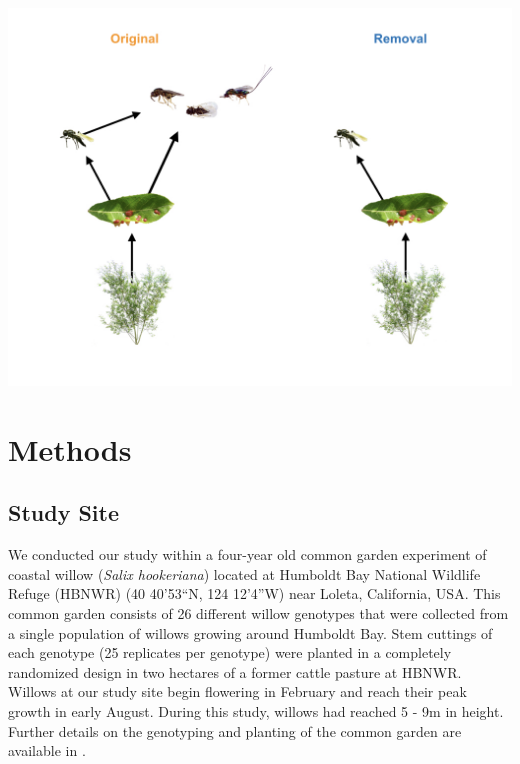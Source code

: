 \documentclass[11pt,]{article}
\let\origfigure\figure
\let\endorigfigure\endfigure
\renewenvironment{figure}[1][2] {
    \expandafter\origfigure\expandafter[H]
} {
    \endorigfigure
}
\begin{document}
\begin{figure}
\centering
\includegraphics{../analyses/complex_simple_foodwebs_v4.jpeg}
\caption{\label{fig:Conceptual}Experimental manipulation of food-web
structure associated with a leaf-galling midge (\emph{Iteomyia
salicisverruca}) feeding on the willow \emph{Salix hookeriana}. Black
arrows denote the flow of energy in this network of trophic
interactions. In the original food web, we allowed the full suite of egg
and larval parasitoids to impose selection. In the removal food web, we
used mesh bags to exclude the guild of larval parasitoids, only allowing
the egg parasitoid (\emph{Platygaster} sp.) to impose selection. Note
that larval parasitoids also impose indirect effects on gall midge
fitness through intraguild predation on the egg parasitoid. Larval
parasitoids include the following species (from left to right):
\emph{Mesopolobus} sp. (Family: Pteromalidae); \emph{Tetrastichus} sp.
(Family: Eulophidae); and \emph{Torymus} sp. (Family: Torymidae).}
\end{figure}

\section{Methods}\label{methods}

\subsection{Study Site}\label{study-site}

We conducted our study within a four-year old common garden experiment
of coastal willow (\emph{Salix hookeriana}) located at Humboldt Bay
National Wildlife Refuge (HBNWR) (40 40'53``N, 124 12'4''W) near Loleta,
California, USA. This common garden consists of 26 different willow
genotypes that were collected from a single population of willows
growing around Humboldt Bay. Stem cuttings of each genotype (25
replicates per genotype) were planted in a completely randomized design
in two hectares of a former cattle pasture at HBNWR. Willows at our
study site begin flowering in February and reach their peak growth in
early August. During this study, willows had reached 5 - 9m in height.
Further details on the genotyping and planting of the common garden are
available in \citet{Barbour2015}.
\end{document}
